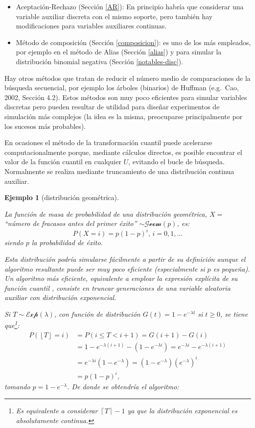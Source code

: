\documentclass[
  10pt,
]{book}
\theoremstyle{break}
\newtheorem{example}{Ejemplo}[chapter]
\theoremstyle{nonumberplain}
\let\oldfootnote\footnote
\renewcommand\footnote[1]{\oldfootnote{\hspace{2mm}#1}}
\begin{document}
\begin{itemize}
\item
  Aceptación-Rechazo (Sección \ref{AR}): En principio habría que considerar una variable auxiliar discreta con el mismo soporte, pero también hay modificaciones para variables auxiliares continuas.
\item
  Método de composición (Sección \ref{composicion}): es uno de los más empleados, por ejemplo en el método de Alias (Sección \ref{alias}) y para simular la distribución binomial negativa (Sección \ref{notables-disc}).
\end{itemize}

Hay otros métodos que tratan de reducir el número medio de comparaciones de la búsqueda secuencial, por ejemplo los árboles (binarios) de Huffman (e.g.~Cao, 2002, Sección 4.2).
Estos métodos son muy poco eficientes para simular variables discretas pero pueden resultar de utilidad para diseñar experimentos de simulación más complejos (la idea es la misma, preocuparse principalmente por los sucesos más probables).

En ocasiones el método de la transformación cuantil puede acelerarse computacionalmente porque, mediante cálculos directos, es posible encontrar el valor de la función cuantil en cualquier \(U\), evitando el bucle de búsqueda.
Normalmente se realiza mediante truncamiento de una distribución continua auxiliar.

\begin{example}[distribución geométrica]
\protect\hypertarget{exm:transcuant-directo}{}\label{exm:transcuant-directo}

La función de masa de probabilidad de una distribución geométrica, \(X =\) ``número de fracasos antes del primer éxito'' \(\sim \mathcal{Geom}(p)\), es:
\[P(X = i) = p(1-p)^i \text{, } i = 0, 1, \ldots\]
siendo \(p\) la probabilidad de éxito.

Esta distribución podría simularse fácilmente a partir de su definición aunque el algoritmo resultante puede ser muy poco eficiente (especialmente si \(p\) es pequeña).
Un algoritmo más eficiente, equivalente a emplear la expresión explícita de su función cuantil \citep[e.g.][sec.~4.1.2]{cao2002}, consiste en truncar generaciones de una variable aleatoria auxiliar con distribución exponencial.

Si \(T \sim \mathcal{Exp}(\lambda)\), con función de distribución \(G(t) = 1-e^{-\lambda t}\) si \(t \geq 0\), se tiene que\footnote{Es equivalente a considerar \(\left\lceil T \right\rceil -1\) ya que la distribución exponencial es absolutamente continua.}:
\[\begin{aligned}
P\left( \left\lfloor T \right\rfloor = i \right) 
& = P(i \leq T < i + 1 ) = G(i + 1) - G(i) \\  
& = 1-e^{-\lambda (i+1)} - \left(1-e^{-\lambda i}\right)  = e^{-\lambda i} - e^{-\lambda (i+1)}\\
& = e^{-\lambda i }\left(1-e^{-\lambda}\right)  
= \left(1-e^{-\lambda}\right)  \left(e^{-\lambda}\right)^i \\
& = p(1-p)^i,
\end{aligned}\]
tomando \(p=1-e^{-\lambda}\).
De donde se obtendría el algoritmo:
\end{example}
\end{document}

